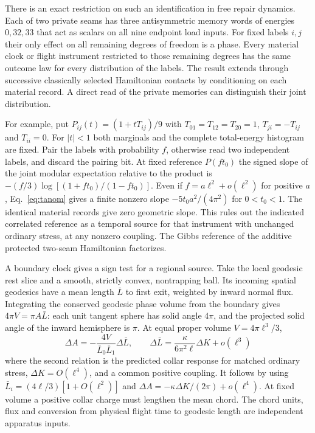 \documentclass[11pt]{article}
\begin{document}
There is an exact restriction on such an identification in free repair
dynamics. Each of two private seams has three antisymmetric memory
words of energies $0,32,33$ that act as scalars on all nine endpoint
load inputs. For fixed labels $i,j$ their only effect on all remaining
degrees of freedom is a phase. Every material clock or flight instrument
restricted to those remaining degrees has the same outcome law for
every distribution of the labels. The result extends through successive
classically selected Hamiltonian contacts by conditioning on each material record.
A direct read of the private memories can distinguish their joint
distribution.

For example, put $P_{ij}(t)=(1+tT_{ij})/9$ with $T_{01}=T_{12}=T_{20}=1$,
$T_{ji}=-T_{ij}$ and $T_{ii}=0$. For $|t|<1$ both marginals and the
complete total-energy histogram are fixed. Pair the labels with
probability $f$, otherwise read two independent labels, and discard the
pairing bit. At fixed reference $P(ft_0)$ the signed slope of the
joint modular expectation relative to the product is
$-(f/3)\log[(1+ft_0)/(1-ft_0)]$. Even if $f=a\ell^2+o(\ell^2)$
for positive $a$, Eq.~\eqref{eq:tanom} gives a finite nonzero slope
$-5t_0a^2/(4\pi^2)$ for $0<t_0<1$. The identical material records
give zero geometric slope. This rules out the indicated correlated
reference as a temporal source for that instrument with unchanged
ordinary stress, at any nonzero coupling. The Gibbs reference of the
additive protected two-seam Hamiltonian factorizes.

A boundary clock gives a sign test for a regional source. Take the local
geodesic rest slice and a smooth, strictly convex, nontrapping ball. Its
incoming spatial geodesics have a mean length \(\bar L\) to first exit,
weighted by inward normal flux. Integrating the conserved geodesic phase
volume from the boundary gives \(4\pi V=\pi A\bar L\): each unit tangent
sphere has solid angle \(4\pi\), and the projected solid angle of the inward
hemisphere is \(\pi\). At equal proper volume \(V=4\pi\ell^3/3\),
\[
 \Delta A=-\frac{4V}{\bar L_0\bar L_1}\Delta\bar L,\qquad
 \Delta\bar L=\frac{\kappa}{6\pi^2\ell}\Delta K+o(\ell^3)
\]
where the second relation is the predicted collar response for matched
ordinary stress, \(\Delta K=O(\ell^4)\), and a common positive coupling.
It follows by using \(\bar L_i=(4\ell/3)[1+O(\ell^2)]\) and
\(\Delta A=-\kappa\Delta K/(2\pi)+o(\ell^4)\). At fixed volume a positive
collar charge must lengthen the mean chord. The chord units, flux and
conversion from physical flight time to geodesic length are independent
apparatus inputs.
\end{document}
